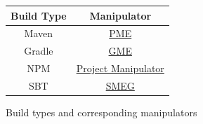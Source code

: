 \documentclass[../main.tex]{subfiles}
\begin{document}
\begin{figure}
    \begin{center}
    \begin{tabular}{ |c|c| }
    \hline
    Build Type & Manipulator \\
    \hline
    Maven & \href{https://github.com/release-engineering/pom-manipulation-ext}{PME} \\ 
    Gradle & \href{https://github.com/project-ncl/gradle-manipulator}{GME} \\ 
    NPM & \href{https://github.com/project-ncl/project-manipulator}{Project Manipulator} \\ 
    SBT & \href{https://github.com/project-ncl/smeg}{SMEG} \\
    \hline
    \end{tabular}
    \end{center}
    \caption{Build types and corresponding manipulators}
    \label{table:build-types-and-manipulators}
\end{figure}
\end{document}
